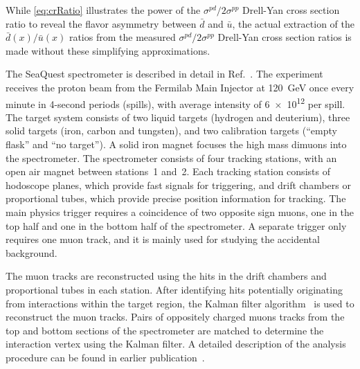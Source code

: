 \documentclass[reprint,aps,unsortedaddress,superscriptaddress,prl,floatfix,showpacs,linenumbers]{revtex4-2}
\begin{document}
While \cref{eq:crRatio} illustrates the power of the $\sigma^{pd}/2\sigma^{pp}$ Drell-Yan cross section
ratio to reveal the flavor asymmetry between $\bar{d}$ and $\bar{u}$,
the actual extraction of the $\bar{d}\left(x\right) / \bar{u}\left(x\right)$
ratios from the measured $\sigma^{pd}/ 2 \sigma^{pp}$ Drell-Yan cross
section ratios is made without these simplifying approximations.

The SeaQuest spectrometer is  described in detail in Ref.~\cite{aidala2019}.
The experiment receives the  proton beam from the Fermilab Main
Injector at \SI{120}{\GeV}
once every minute in 4-second periods (spills), with average intensity
of \num{6e12} per spill.
The target system consists of two liquid targets (hydrogen and deuterium),
three solid targets (iron, carbon and tungsten), and two calibration
targets (``empty flask'' and ``no target'').
A solid iron magnet focuses the high mass dimuons into the spectrometer.
The spectrometer consists of four tracking stations, with an open
air magnet between stations~1 and~2.
Each tracking station consists of hodoscope planes, which
provide fast signals for triggering,
and drift chambers or proportional tubes, which provide precise
position information for tracking.
The main physics trigger requires a coincidence of two opposite sign muons,
one in the top half and one in the bottom half of the spectrometer.
A separate trigger only requires one muon track, and it is mainly used
for studying the accidental background.

The muon tracks are reconstructed using the hits in the drift chambers and proportional tubes in each station.
After identifying hits potentially originating from interactions within the target region,
the Kalman filter algorithm~\cite{kalman1960} is used to reconstruct the muon tracks.
Pairs of oppositely charged muons tracks from the top and bottom sections of the spectrometer are
matched to determine the interaction vertex using the Kalman filter.
A detailed description of the analysis procedure can be found in earlier publication~\cite{dove2021,dove2023}.
\end{document}
